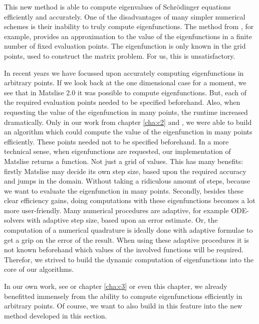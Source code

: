 This new method is able to compute eigenvalues of Schrödinger equations efficiently and accurately. One of the disadvantages of many simpler numerical schemes is their inability to truly compute eigenfunctions. The method from \cite{wang_new_2009}, for example, provides an approximation to the value of the eigenfunctions in a finite number of fixed evaluation points. The eigenfunction is only known in the grid points, used to construct the matrix problem. For us, this is unsatisfactory.

In recent years we have focussed upon accurately computing eigenfunctions in arbitrary points. If we look back at the one dimensional case for a moment, we see that in Matslise 2.0 \cite{ledoux_matslise_2016a} it was possible to compute eigenfunctions. But, each of the required evaluation points needed to be specified beforehand. Also, when requesting the value of the eigenfunction in many points, the runtime increased dramatically. Only in our work from chapter \ref{cha:c2} and \cite{baeyens_fast_2020}, we were able to build an algorithm which could compute the value of the eigenfunction in many points efficiently. These points needed not to be specified beforehand. In a more technical sense, when eigenfunctions are requested, our implementation of Matslise returns a function. Not just a grid of values. This has many benefits: firstly Matslise may decide its own step size, based upon the required accuracy and jumps in the domain. Without taking a ridiculous amount of steps, because we want to evaluate the eigenfunction in many points. Secondly, besides these clear efficiency gains, doing computations with these eigenfunctions becomes a lot more user-friendly. Many numerical procedures are adaptive, for example ODE-solvers with adaptive step size, based upon an error estimate. Or, the computation of a numerical quadrature is ideally done with adaptive formulae to get a grip on the error of the result. When using these adaptive procedures it is not known beforehand which values of the involved functions will be required. Therefor, we strived to build the dynamic computation of eigenfunctions into the core of our algorithms.

In our own work, see \cite{baeyens_improvements_2022} or chapter \ref{cha:c3} or even this chapter, we already benefitted immensely from the ability to compute eigenfunctions efficiently in arbitrary points. Of course, we want to also build in this feature into the new method developed in this section.

